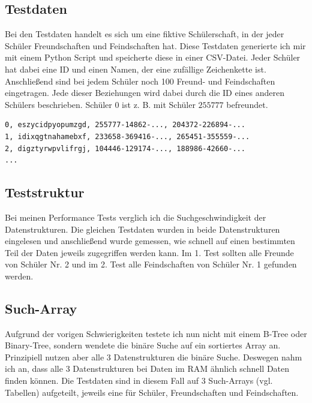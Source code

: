 \documentclass[11pt,a4paper]{article}
\begin{document}
\subsection{Testdaten}

Bei den Testdaten handelt es sich um eine fiktive Schülerschaft, in der jeder
Schüler Freundschaften und Feindschaften hat. Diese Testdaten generierte ich mir
mit einem Python Script und speicherte diese in einer CSV-Datei.
Jeder Schüler hat dabei eine ID und einen Namen, der eine zufällige Zeichenkette ist.
Anschließend sind bei jedem Schüler noch 100 Freund- und Feindschaften eingetragen.
Jede dieser Beziehungen wird dabei durch die ID eines anderen Schülers beschrieben.
Schüler $0$ ist z. B. mit Schüler $255777$ befreundet.

\begin{lstlisting}
0, eszycidpyopumzgd, 255777-14862-..., 204372-226894-...
1, idixqgtnahamebxf, 233658-369416-..., 265451-355559-...
2, digztyrwpvlifrgj, 104446-129174-..., 188986-42660-...
...
\end{lstlisting}

\subsection{Teststruktur}

Bei meinen Performance Tests verglich ich die Suchgeschwindigkeit der Datenstrukturen.
Die gleichen Testdaten wurden in beide Datenstrukturen eingelesen und anschließend
wurde gemessen, wie schnell auf einen bestimmten Teil der Daten jeweils zugegriffen
werden kann. Im 1. Test sollten alle Freunde von Schüler Nr. 2 und im 2. Test alle
Feindschaften von Schüler Nr. 1 gefunden werden.

\subsection{Such-Array}

Aufgrund der vorigen Schwierigkeiten testete ich nun nicht
mit einem B-Tree oder Binary-Tree, sondern wendete die binäre Suche
auf ein sortiertes Array an. Prinzipiell nutzen aber alle 3 Datenstrukturen die
binäre Suche. Deswegen nahm ich an, dass alle 3 Datenstrukturen bei Daten im RAM
ähnlich schnell Daten finden können.
Die Testdaten sind in diesem Fall auf 3 Such-Arrays (vgl. Tabellen)
aufgeteilt, jeweils eine für Schüler, Freundschaften und Feindschaften.
\end{document}
